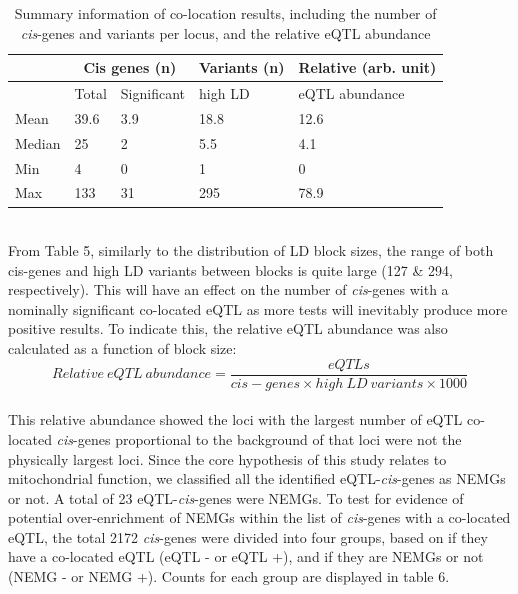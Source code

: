 \documentclass{article}
\begin{document}
\begin{table}[h]
\centering
\caption{Summary information of co-location results, including the number of \textit{cis}-genes and variants per locus, and the relative eQTL abundance}
\label{tab:my-table}
\begin{tabular}{|l|ll|l|l|}
\hline
       & \multicolumn{2}{c|}{Cis genes (n)}       & Variants (n) & Relative (arb. unit) \\ \hline
       & \multicolumn{1}{l|}{Total} & Significant & high LD      & eQTL abundance       \\ \hline
Mean   & \multicolumn{1}{l|}{39.6}  & 3.9         & 18.8         & 12.6                 \\ \hline
Median & \multicolumn{1}{l|}{25}    & 2           & 5.5          & 4.1                  \\ \hline
Min    & \multicolumn{1}{l|}{4}     & 0           & 1            & 0                    \\ \hline
Max    & \multicolumn{1}{l|}{133}   & 31          & 295          & 78.9                 \\ \hline
\end{tabular}
\end{table}
\\From Table 5, similarly to the distribution of LD block sizes, the range of both cis-genes and high LD variants between blocks is quite large (127 \& 294, respectively). This will have an effect on the number of \textit{cis}-genes with a nominally significant co-located eQTL as more tests will inevitably produce more positive results. To indicate this, the relative eQTL abundance was also calculated as a function of block size:
\[ 
Relative\ eQTL\ abundance = \frac{eQTLs}{\textit{cis}-genes \times high\ LD\ variants \times 1000}
\]
\\This relative abundance showed the loci with the largest number of eQTL co-located \textit{cis}-genes proportional to the background of that loci were not the physically largest loci.
\label{fisher1}
Since the core hypothesis of this study relates to mitochondrial function, we classified all the identified eQTL-\textit{cis}-genes as NEMGs or not. A total of 23 eQTL-\textit{cis}-genes were NEMGs. To test for evidence of potential over-enrichment of NEMGs within the list of \textit{cis}-genes with a co-located eQTL, the total 2172 \textit{cis}-genes were divided into four groups, based on if they have a co-located eQTL (eQTL - or eQTL +), and if they are NEMGs or not (NEMG - or NEMG +). Counts for each group are displayed in table 6.
\end{document}
